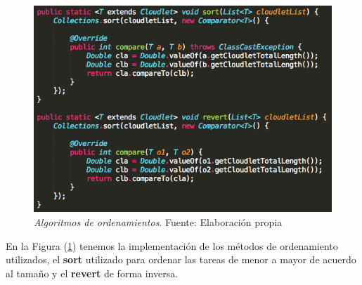 \newpage


\renewcommand\thefigure{\arabic{figure}}
\begin{figure}[h!]
	\centering
	\includegraphics[scale=0.5]{media/ordenamientos}
	\caption{\textit{Algoritmos de ordenamientos}. Fuente: Elaboración propia}
	\label{fig:sortRevert}
\end{figure}

En la Figura (\ref{fig:sortRevert}) tenemos la implementaci\'on de los m\'etodos de ordenamiento utilizados, el \textbf{sort} utilizado para ordenar las tareas de menor a mayor de acuerdo al tamaño y el \textbf{revert} de forma inversa.

